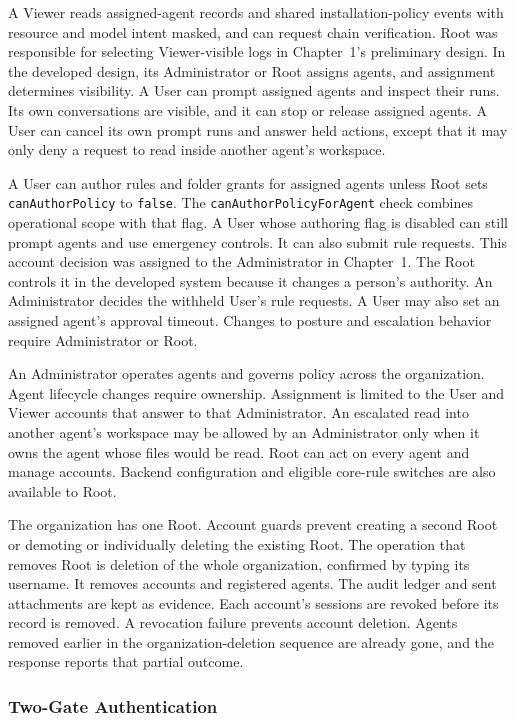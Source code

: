 {\color{red}A Viewer reads assigned-agent records and shared installation-policy events
with resource and model intent masked, and can request chain verification.
Root was responsible for selecting Viewer-visible logs in Chapter~1's preliminary design. In the developed
design, its Administrator or Root assigns agents, and assignment determines
visibility. A User can prompt assigned agents and inspect their runs. Its own
conversations are visible, and it can stop or release assigned agents. A User can cancel its own prompt runs and
answer held actions, except that it may only deny a request to read inside
another agent's workspace.

A User can author rules and folder grants for assigned agents unless Root sets
\texttt{canAuthorPolicy} to \texttt{false}. The
\texttt{canAuthorPolicyForAgent} check combines operational scope with that
flag. A User whose authoring flag is disabled can still prompt agents and use
emergency controls. It can also submit rule requests. This account decision was assigned to the Administrator in Chapter~1. The
Root controls it in the developed system because it changes a person's authority.
An Administrator decides the withheld User's rule requests. A User may also set
an assigned agent's approval timeout. Changes to posture and escalation behavior
require Administrator or Root.

An Administrator operates agents and governs policy across the organization.
Agent lifecycle changes require ownership. Assignment is limited to the User
and Viewer accounts that answer to that Administrator. An escalated read into
another agent's workspace may be allowed by an Administrator only when it owns
the agent whose files would be read. Root can act on every agent and manage
accounts. Backend configuration and eligible core-rule switches are also available to Root.

The organization has one Root. Account guards prevent creating a second Root
or demoting or individually deleting the existing Root. The operation that
removes Root is deletion of the whole organization, confirmed by typing its
username. It removes accounts and registered agents. The audit
ledger and sent attachments are kept as evidence. Each account's sessions
are revoked before its record is removed. A revocation failure prevents account
deletion. Agents removed earlier in the organization-deletion sequence are
already gone, and the response reports that partial outcome.}

\FloatBarrier
\subsubsection{Two-Gate Authentication}
\label{sec:two-gt-auth}

